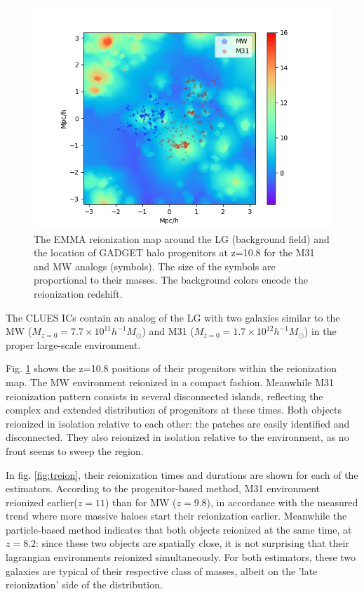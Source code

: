 \documentclass[twocolumn]{aastex61}
\begin{document}
\begin{figure}[ht]
\includegraphics[width=1.2\columnwidth]{img/map_LG.png}
\caption{The EMMA reionization map around the LG (background field) and the location of GADGET halo progenitors at z=10.8 for the M31 and MW analogs (symbols). The size of the symbols are proportional to their masses. The background colors encode the reionization redshift.}
\label{fig:LG}
\end{figure}

The CLUES ICs contain an analog of the LG with two galaxies similar to the MW ($M_{z=0}=7.7\times 10^{11} h^{-1} M_\odot$) and M31 ($M_{z=0}=1.7 \times 10^{12} h^{-1} M_\odot$) in the proper large-scale environment.

Fig. \ref{fig:LG} shows the z=10.8 positions of their progenitors within the reionization map. The MW environment reionized in a compact fashion. Meanwhile M31 reionization pattern consists in several disconnected islands, reflecting the complex and extended distribution of progenitors at these times. Both objects reionized in isolation relative to each other: the patches are easily identified and disconnected. They also reionized in isolation relative to the environment, as no front seems to sweep the region.

In fig. \ref{fig:treion}, their reionization times and durations are shown for each of the estimators. According to the progenitor-based method, M31 environment reionized earlier($z=11$) than for MW ($z=9.8$), in accordance with the measured trend where more massive haloes start their reionization earlier. Meanwhile the particle-based method indicates that both objects reionized at the same time, at $z=8.2$: since these two objects are spatially close, it is not surprising that their lagrangian environments reionized simultaneously. For both estimators, these two galaxies are typical of their respective class of masses, albeit on the 'late reionization' side of the distribution. 
\end{document}
